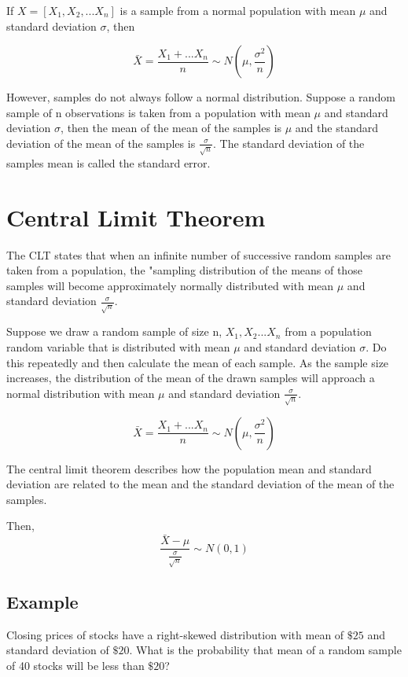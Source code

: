 \documentclass{article}
\begin{document}
    If $X=[X_{1}, X_{2}, ... X_{n}]$ is a sample from a normal population with mean $\mu$ and 
    standard deviation $\sigma$, then

    \begin{equation*}
        \bar{X} = \frac{X_{1}+...X_{n}}{n} \sim N(\mu, \frac{\sigma^{2}}{n})
    \end{equation*}

    However, samples do not always follow a normal distribution. Suppose a random sample of 
    n observations is taken from a population with mean $\mu$ and standard deviation $\sigma$,
    then the mean of the mean of the samples is $\mu$ and the standard deviation of the mean of 
    the samples is $\frac{\sigma}{\sqrt{n}}$. The standard deviation of the samples mean is called the standard error.
    
    \section*{Central Limit Theorem}
    The CLT states that when an infinite number of successive random samples are taken from a population, the "sampling 
    distribution of the means of those samples will become approximately normally distributed with mean $\mu$ and 
    standard deviation $\frac{\sigma}{\sqrt{n}}$.

    Suppose we draw a random sample of size n, $X_{1}, X_{2}...X_{n}$ from a population random variable that is distributed
    with mean $\mu$ and standard deviation $\sigma$. Do this repeatedly and then calculate the mean of each sample. As the sample size
    increases, the distribution of the mean of the drawn samples will approach a normal distribution with mean $\mu$ and standard deviation $\frac{\sigma}{\sqrt{n}}$.


    \begin{equation*}
        \bar{X} = \frac{X_{1}+...X_{n}}{n} \sim N(\mu, \frac{\sigma^{2}}{n})
    \end{equation*}

    The central limit theorem describes how the population mean and standard deviation 
    are related to the mean and the standard deviation of the mean of the samples.

    Then,
    \begin{equation*}
        \frac{\bar{X}-\mu}{\frac{\sigma}{\sqrt{n}}} \sim N(0, 1)
    \end{equation*}

    \subsection*{Example}
    Closing prices of stocks have a right-skewed distribution with mean of $\$25$ and standard deviation of $\$20$.
    What is the probability that mean of a random sample of 40 stocks will be less than $\$20$?
\end{document}
